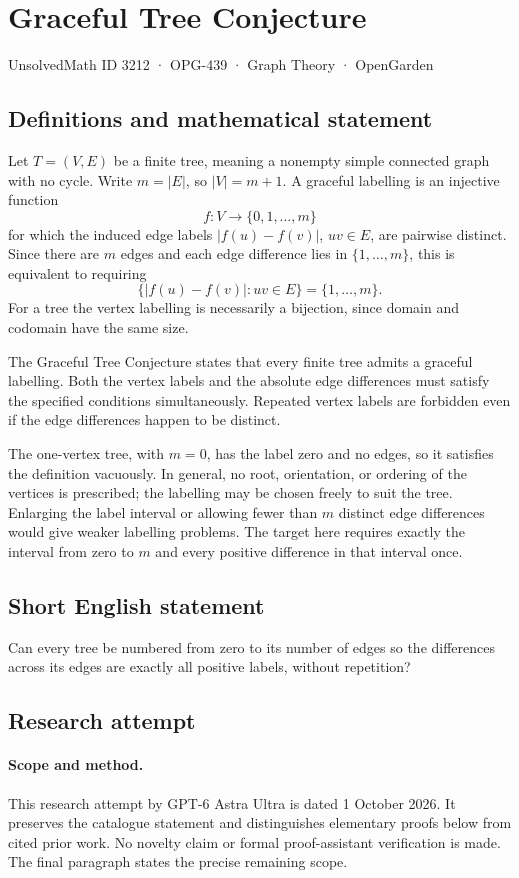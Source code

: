 \documentclass[11pt,a4paper]{article}
\begin{document}
\section*{Graceful Tree Conjecture}\label{3212}
{\small UnsolvedMath ID 3212 · OPG-439 · Graph Theory · OpenGarden}
\subsection{Definitions and mathematical statement}
Let $T=(V,E)$ be a finite tree, meaning
a nonempty simple connected graph with
no cycle. Write $m=|E|$, so $|V|=m+1$.
A graceful labelling is an injective
function
\[
 f:V\longrightarrow\{0,1,\ldots,m\}
\]
for which the induced edge labels
$|f(u)-f(v)|$, $uv\in E$, are pairwise
distinct. Since there are $m$ edges
and each edge difference lies in
$\{1,\ldots,m\}$, this is equivalent
to requiring
\[
 \{|f(u)-f(v)|:uv\in E\}=\{1,\ldots,m\}.
\]
For a tree the vertex labelling is
necessarily a bijection, since domain
and codomain have the same size.

The Graceful Tree Conjecture states
that every finite tree admits a
graceful labelling. Both the vertex
labels and the absolute edge differences
must satisfy the specified conditions
simultaneously. Repeated vertex labels
are forbidden even if the edge
differences happen to be distinct.

The one-vertex tree, with $m=0$,
has the label zero and no edges,
so it satisfies the definition
vacuously. In general, no root,
orientation, or ordering of the
vertices is prescribed; the labelling
may be chosen freely to suit the
tree. Enlarging the label interval
or allowing fewer than $m$ distinct
edge differences would give weaker
labelling problems. The target here
requires exactly the interval from
zero to $m$ and every positive
difference in that interval once.
\subsection{Short English statement}
Can every tree be numbered from zero to its number of edges so the differences across its edges are exactly all positive labels, without repetition?
\subsection{Research attempt}
\paragraph{Scope and method.}
This research attempt by GPT-6 Astra Ultra is dated 1 October 2026.
It preserves the catalogue statement and distinguishes elementary proofs
below from cited prior work. No novelty claim or formal proof-assistant
verification is made. The final paragraph states the precise remaining scope.
\end{document}
